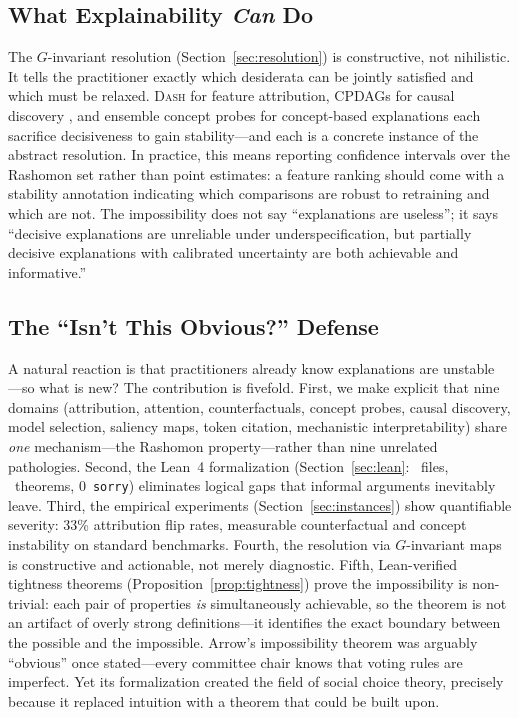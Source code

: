 \documentclass[twoside]{jmlr}
\newcommand{\DASH}{\textsc{Dash}}
\begin{document}
\subsection{What Explainability \emph{Can} Do}
\label{sec:can-do}

The $G$-invariant resolution (Section~\ref{sec:resolution}) is constructive, not
nihilistic.  It tells the practitioner exactly which desiderata can be jointly
satisfied and which must be relaxed.  \DASH{} for feature attribution, CPDAGs
for causal discovery \citep{verma1991equivalence}, and ensemble concept probes
for concept-based explanations \citep{kim2018tcav} each sacrifice decisiveness
to gain stability---and each is a concrete instance of the abstract resolution.
In practice, this means reporting confidence intervals over the Rashomon set
\citep{fisher2019models,semenova2022existence} rather than point estimates:
a feature ranking should come with a stability annotation indicating which
comparisons are robust to retraining and which are not.  The impossibility does
not say ``explanations are useless''; it says ``decisive explanations are
unreliable under underspecification, but partially decisive explanations with
calibrated uncertainty are both achievable and informative.''

\subsection{The ``Isn't This Obvious?'' Defense}
\label{sec:obvious}

A natural reaction is that practitioners already know explanations are unstable
---so what is new?  The contribution is fivefold.  First, we make explicit that
nine domains (attribution, attention, counterfactuals, concept probes, causal
discovery, model selection, saliency maps, token citation, mechanistic
interpretability) share \emph{one} mechanism---the Rashomon
property---rather than nine unrelated pathologies.  Second, the Lean~4
formalization (Section~\ref{sec:lean}: \ClaimMainFiles~files, \ClaimMainTheorems~theorems, 0~\texttt{sorry})
eliminates logical gaps that informal arguments inevitably leave.  Third, the
empirical experiments (Section~\ref{sec:instances}) show quantifiable severity:
33\% attribution flip rates, measurable counterfactual and concept instability on
standard benchmarks.  Fourth, the resolution via $G$-invariant maps is
constructive and actionable, not merely diagnostic.  Fifth, Lean-verified
tightness theorems (Proposition~\ref{prop:tightness}) prove the impossibility
is non-trivial: each pair of properties \emph{is} simultaneously achievable,
so the theorem is not an artifact of overly strong definitions---it identifies
the exact boundary between the possible and the impossible.
Arrow's impossibility
theorem \citep{arrow1951social} was arguably ``obvious'' once stated---every
committee chair knows that voting rules are imperfect.  Yet its formalization
created the field of social choice theory, precisely because it replaced
intuition with a theorem that could be built upon.
\end{document}
